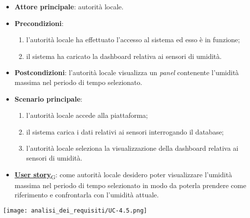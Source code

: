\begin{itemize}
	\item \textbf{Attore principale}: autorità locale.
	\item \textbf{Precondizioni}:
	      \begin{enumerate}
		      \item l'autorità locale ha effettuato l'accesso al sistema ed esso è in funzione;
		      \item il sistema ha caricato la dashboard relativa ai sensori di umidità.
	      \end{enumerate}
	\item \textbf{Postcondizioni}: l'autorità locale visualizza un \textit{panel} contenente l'umidità massima nel periodo di tempo selezionato.
	\item \textbf{Scenario principale}:
	      \begin{enumerate}
		      \item l'autorità locale accede alla piattaforma;
		      \item il sistema carica i dati relativi ai sensori interrogando il database;
		      \item l'autorità locale seleziona la visualizzazione della dashboard relativa ai sensori di umidità.
	      \end{enumerate}
	\item \href{https://7last.github.io/docs/rtb/documentazione-interna/glossario\#user-story}{\textbf{User story}\textsubscript{G}}:
	      come autorità locale desidero poter visualizzare l'umidità massima nel periodo di tempo selezionato
	      in modo da poterla prendere come riferimento e confrontarla con l'umidità attuale.
\end{itemize}
\begin{center}
	\texttt{[image: analisi\_dei\_requisiti/UC-4.5.png]}
\end{center}


